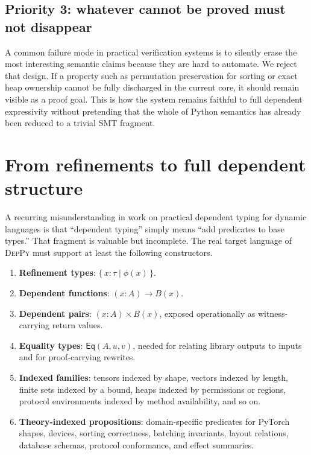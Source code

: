 \documentclass[11pt]{article}
\newcommand{\DepPy}{\textsc{DepPy}}
\newcommand{\liquid}[1]{\{\, #1 \,\}}
\theoremstyle{definition}
\theoremstyle{plain}
\begin{document}
\subsection{Priority 3: whatever cannot be proved must not disappear}
A common failure mode in practical verification systems is to silently erase the
most interesting semantic claims because they are hard to automate. We reject
that design. If a property such as permutation preservation for sorting or exact
heap ownership cannot be fully discharged in the current core, it should remain
visible as a proof goal. This is how the system remains faithful to full
dependent expressivity without pretending that the whole of Python semantics has
already been reduced to a trivial SMT fragment.



\section{From refinements to full dependent structure}

A recurring misunderstanding in work on practical dependent typing for dynamic
languages is that ``dependent typing'' simply means ``add predicates to base
types.'' That fragment is valuable but incomplete. The real target language of
\DepPy{} must support at least the following constructors.

\begin{enumerate}[label=\arabic*.]
  \item \textbf{Refinement types}: \(\liquid{x : \tau \mid \phi(x)}\).
  \item \textbf{Dependent functions}: \((x : A) \to B(x)\).
  \item \textbf{Dependent pairs}: \((x : A) \times B(x)\), exposed operationally as
  witness-carrying return values.
  \item \textbf{Equality types}: \(\mathsf{Eq}(A, u, v)\), needed for relating library
  outputs to inputs and for proof-carrying rewrites.
  \item \textbf{Indexed families}: tensors indexed by shape, vectors indexed by
  length, finite sets indexed by a bound, heaps indexed by permissions or
  regions, protocol environments indexed by method availability, and so on.
  \item \textbf{Theory-indexed propositions}: domain-specific predicates for
  PyTorch shapes, devices, sorting correctness, batching invariants, layout
  relations, database schemas, protocol conformance, and effect summaries.
\end{enumerate}
\end{document}
